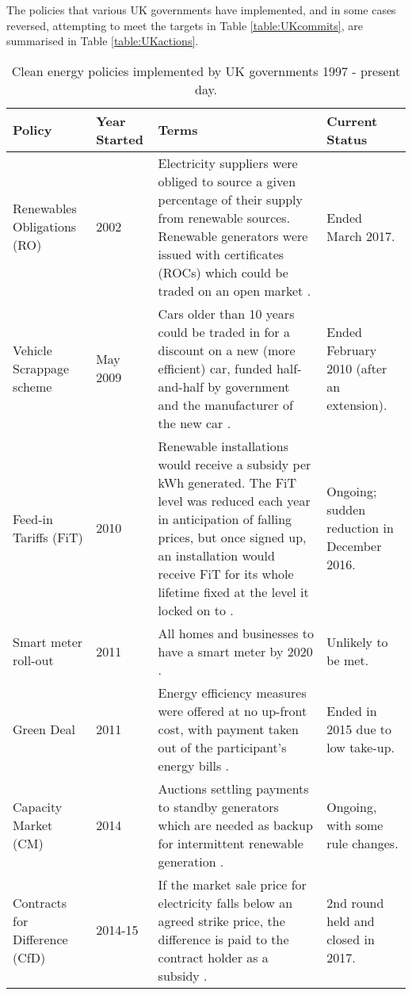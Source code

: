 \documentclass[report_18month.tex]{subfiles}
\begin{document}
The policies that various UK governments have implemented, and in some cases reversed, attempting to meet the targets in Table \ref{table:UKcommits}, are summarised in Table \ref{table:UKactions}.
\begin{center}
\begin{table}[h!]
\caption{Clean energy policies implemented by UK governments 1997 - present day.}
\begin{tabular}{ M{2.4cm} M{1.3cm} M{7.6cm} M{3cm} }
 Policy & Year Started & Terms & Current Status \\ 
\hline
 Renewables Obligations (RO) & 2002 & Electricity suppliers were obliged to source a given percentage of their supply from renewable sources. Renewable generators were issued with certificates (ROCs) which could be traded on an open market \cite{ofgem2017roc}. & Ended March 2017. \\
\hline
 Vehicle Scrappage scheme & May 2009 & Cars older than 10 years could be traded in for a  discount on a new (more efficient) car, funded half-and-half by government and the manufacturer of the new car \cite{harari2009vehiclescrap}. & Ended February 2010 (after an extension). \\
\hline
 Feed-in Tariffs (FiT) & 2010 & Renewable installations would receive a subsidy per kWh generated. The FiT level was reduced each year in anticipation of falling prices, but once signed up, an installation would receive FiT for its whole lifetime fixed at the level it locked on to \cite{ofgem2017fit}. & Ongoing; sudden reduction in December 2016. \\
\hline
 Smart meter roll-out & 2011 & All homes and businesses to have a smart meter by 2020 \cite{ofgem2017smartmeters}. & Unlikely to be met. \\
\hline
 Green Deal & 2011 & Energy efficiency measures were offered at no up-front cost, with payment taken out of the participant's energy bills \cite{greendeal2017}. & Ended in 2015 due to low take-up. \\
\hline
 Capacity Market (CM) & 2014 & Auctions settling payments to standby generators which are needed as backup for intermittent renewable generation \cite{mattholie2017cm}. & Ongoing, with some rule changes. \\
\hline
 Contracts for Difference (CfD) & 2014-15 & If the market sale price for electricity falls below an agreed strike price, the difference is paid to the contract holder as a subsidy \cite{beis2017cfd}. & 2nd round held and closed in 2017. \\

\end{tabular}
\end{table}
\end{center}
\end{document}
